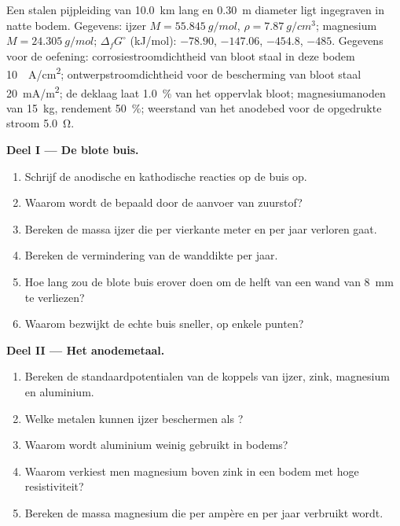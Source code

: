 \begin{problem}
\label{pb:b2:corrosion:1}
Een stalen pijpleiding van \qty{10.0}{km} lang en \qty{0.30}{m} diameter ligt ingegraven in
natte bodem. Gegevens: ijzer $M = \qty{55.845}{g/mol}$, $\rho = \qty{7.87}{g/cm^3}$;
magnesium $M = \qty{24.305}{g/mol}$; $\Delta_f G^\circ$ (\unit{kJ/mol}): 
$-78.90$,  $-147.06$,  $-454.8$,  $-485$. Gegevens voor de
oefening: corrosiestroomdichtheid van bloot staal in deze bodem \qty{10}{\micro
A/cm^2}; ontwerpstroomdichtheid voor de bescherming van bloot staal
\qty{20}{mA/m^2}; de deklaag laat 1.0~\% van het oppervlak bloot; magnesiumanoden
van \qty{15}{kg}, rendement 50~\%; weerstand van het anodebed voor de opgedrukte stroom
\qty{5.0}{\ohm}.

\medskip
\noindent\textbf{Deel I --- De blote buis.}
\begin{enumerate}
  \item Schrijf de anodische en kathodische reacties op de buis op.
  \item Waarom wordt de  bepaald door de aanvoer van zuurstof?
  \item Bereken de massa ijzer die per vierkante meter en per jaar verloren gaat.
  \item Bereken de vermindering van de wanddikte per jaar.
  \item Hoe lang zou de blote buis erover doen om de helft van een wand van \qty{8}{mm} te verliezen?
  \item Waarom bezwijkt de echte buis sneller, op enkele punten?
\end{enumerate}

\medskip
\noindent\textbf{Deel II --- Het anodemetaal.}
\begin{enumerate}[resume]
  \item Bereken de standaardpotentialen van de koppels van ijzer, zink, magnesium
        en aluminium.
  \item Welke metalen kunnen ijzer beschermen als ?
  \item Waarom wordt aluminium weinig gebruikt in bodems?
  \item Waarom verkiest men magnesium boven zink in een bodem met hoge resistiviteit?
  \item Bereken de massa magnesium die per ampère en per jaar verbruikt wordt.
\end{enumerate}


\end{problem}
